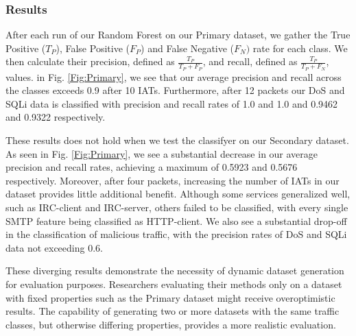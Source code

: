 \documentclass[sigconf]{acmart}
\begin{document}
\subsubsection*{Results}


 After each run of our Random Forest on our Primary dataset, we gather the True Positive ($T_{P}$), False Positive ($F_{P}$) and False Negative ($F_{N})$ rate for each class. We then calculate their precision, defined as $ \frac{T_P}{T_P + F_P}$, and recall, defined as $ \frac{T_P}{T_P + F_N}$, values. in Fig. \ref{Fig:Primary}, we see that our average precision and recall across the classes exceeds 0.9 after 10 IATs. Furthermore, after 12 packets our DoS and SQLi data is classified with precision and recall rates of 1.0 and 1.0 and 0.9462 and 0.9322 respectively.

These results does not hold when we test the classifyer on our Secondary dataset. As seen in Fig. \ref{Fig:Primary}, we see a substantial decrease in our average precision and recall rates, achieving a maximum of 0.5923 and 0.5676 respectively. Moreover, after four packets, increasing the number of IATs in our dataset provides little additional benefit. Although some services generalized well, such as IRC-client and IRC-server, others failed to be classified, with every single SMTP feature being classified as HTTP-client. We also see a substantial drop-off in the classification of malicious traffic, with the precision rates of DoS and SQLi data not exceeding 0.6.

These diverging results demonstrate the necessity of dynamic dataset generation for evaluation purposes. Researchers evaluating their methods only on a dataset with fixed properties such as the Primary dataset might receive overoptimistic results. The capability of generating two or more datasets with the same traffic classes, but otherwise differing properties, provides a more realistic evaluation.
\end{document}
